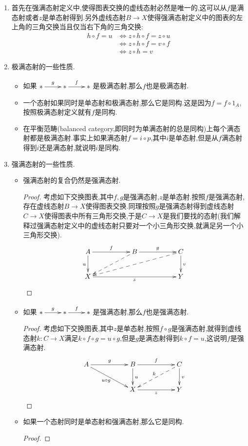 \begin{enumerate}
	\item 首先在强满态射定义中,使得图表交换的虚线态射必然是唯一的,这可以从$f$是满态射或者$z$是单态射得到.另外虚线态射$B\to X$使得强满态射定义中的图表的左上角的三角交换当且仅当右下角的三角交换:
	\begin{align*}
	h\circ f=u&\Leftrightarrow z\circ h\circ f=z\circ u\\&\Leftrightarrow z\circ h\circ f=v\circ f\\&\Leftrightarrow z\circ h=v
	\end{align*}
	\item 极满态射的一些性质.
	\begin{itemize}
		\item 如果$\xymatrix{\ast\ar[r]^g&\ast\ar[r]^f&\ast}$是极满态射,那么$f$也是极满态射.
		\item 一个态射如果同时是单态射和极满态射,那么它是同构.这是因为$f=f\circ 1_A$,按照极满态射定义就有$f$是同构.
		\item 在平衡范畴(balanced category,即同时为单满态射的总是同构)上每个满态射都是极满态射.事实上如果满态射$f=i\circ p$,其中$i$是单态射,但是从$f$满态射得到$i$还是满态射,就说明$i$是同构.
	\end{itemize}
    \item 强满态射的一些性质.
    \begin{itemize}
    	\item 强满态射的复合仍然是强满态射.
    	\begin{proof}
    		
    		考虑如下交换图表,其中$f,g$是强满态射,$z$是单态射.按照$f$是强满态射,存在虚线态射$B\to X$使得图表交换.同理按照$g$是强满态射得到虚线态射$C\to X$使得图表中所有三角形交换,于是$C\to X$是我们要找的态射(我们解释过强满态射定义中的虚线态射只要对一个小三角形交换,就满足另一个小三角形交换).
    		$$\xymatrix{A\ar[rr]^f\ar[d]_u&&B\ar[rr]^g\ar@{-->}[dll]&&C\ar[d]^v\ar@{-->}[dllll]\\X\ar[rrrr]_z&&&&Y}$$
    	\end{proof}
        \item 如果$\xymatrix{\ast\ar[r]^g&\ast\ar[r]^f&\ast}$是强满态射,那么$f$也是强满态射.
        \begin{proof}
        	
        	考虑如下交换图表,其中$z$是单态射,按照$f\circ g$是强满态射,就得到虚线态射$k:C\to X$满足$k\circ f\circ g=u\circ g$,但是$g$是满态射得到$k\circ f=u$,这说明$f$是强满态射.
        	$$\xymatrix{A\ar[rr]^g\ar[drr]_{u\circ g}&&B\ar[d]^u\ar[rr]^f&&C\ar[d]^v\ar@{-->}[dll]_k\\&&X\ar[rr]_z&&Y}$$
        \end{proof}
        \item 如果一个态射同时是单态射和强满态射,那么它是同构.
        \begin{proof}
        	

\end{proof}
\end{itemize}
\end{enumerate}
